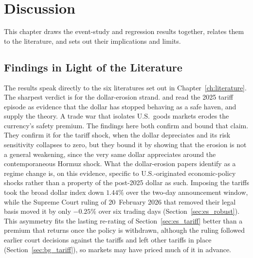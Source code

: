 
\chapter{Discussion}
\label{ch:discussion}

This chapter draws the event-study and regression results together, relates them to the
literature, and sets out their implications and limits.

\section{Findings in Light of the Literature}
\label{sec:disc_literature}

The results speak directly to the six literatures set out in Chapter~\ref{ch:literature}.
The sharpest verdict is for the dollar-erosion strand. \textcite{kamin_2025} and
\textcite{jiang_krishnamurthy_lustig_richmond_2026} read the 2025 tariff episode as evidence that the dollar has stopped
behaving as a safe haven, and \textcite{hassan_mertens_wang_zhang_2025} supply the theory. A trade war that
isolates U.S.\ goods markets erodes the currency's safety premium. The findings here both
confirm and bound that claim. They confirm it for the tariff shock, when the dollar depreciates
and its risk sensitivity collapses to zero, but they bound it by showing that the erosion is
not a general weakening, since the very same dollar appreciates around the contemporaneous Hormuz
shock. What the dollar-erosion papers identify as a regime change is, on this evidence,
specific to U.S.-originated economic-policy shocks rather than a property of the post-2025
dollar as such. Imposing the tariffs took the broad dollar index down $1.44\%$ over the two-day announcement window, while the Supreme Court ruling of 20~February 2026 that removed their legal basis moved it by only $-0.25\%$ over six trading days (Section~\ref{sec:es_robust}). This asymmetry fits the lasting re-rating of Section~\ref{sec:es_tariff} better than a premium that returns once the policy is withdrawn, although the ruling followed earlier court decisions against the tariffs and left other tariffs in place (Section~\ref{sec:bg_tariff}), so markets may have priced much of it in advance.

